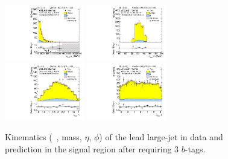 \clearpage

\begin{figure}[htbp!]
\begin{center}
\includegraphics[width=0.31\textwidth,angle=-90]{figures/boosted/Signal/b77_ThreeTag_Signal_leadHCand_Pt_m.pdf}
\includegraphics[width=0.31\textwidth,angle=-90]{figures/boosted/Signal/b77_ThreeTag_Signal_leadHCand_Mass_s.pdf}\\
\includegraphics[width=0.31\textwidth,angle=-90]{figures/boosted/Signal/b77_ThreeTag_Signal_leadHCand_Eta.pdf}
\includegraphics[width=0.31\textwidth,angle=-90]{figures/boosted/Signal/b77_ThreeTag_Signal_leadHCand_Phi.pdf}
  \caption{Kinematics (\pt~, mass, $\eta$, $\phi$) of the lead large-\R jet in data and prediction in the signal region after requiring 3 $b$-tags. }
  \label{fig:boosted-3b-signal-ak10-lead}
\end{center}
\end{figure}

